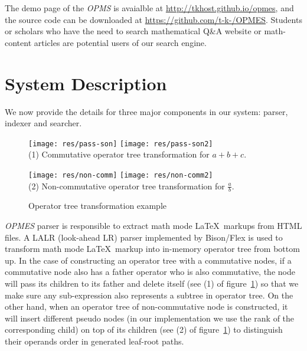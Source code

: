 \documentclass{llncs}
\begin{document}
The demo page of the {\em OPMS} is avaialble at
\url{http://tkhost.github.io/opmes}, and the source code can be downloaded 
at \url{https://github.com/t-k-/OPMES}. Students or scholars who have the 
need to search mathematical Q\&A website or math-content articles are potential 
users of our search engine.


\section{System Description}
We now provide the details for three major components in our system: 
parser, indexer and searcher.

\begin{figure}
\begin{minipage}[b]{2.2in}
\begin{center}
{\texttt{[image: res/pass-son]}}
\hspace*{0.2in}
{\texttt{[image: res/pass-son2]}}
\\ (1) Commutative operator tree transformation for $a+b+c$. 
\end{center}
\end{minipage}
\hspace*{0.2in}
\begin{minipage}[b]{2.2in}
\begin{center}
{\texttt{[image: res/non-comm]}}
\hspace*{0.2in}
{\texttt{[image: res/non-comm2]}}
\\ (2) Non-commutative operator tree transformation for $\frac a b$. 
\end{center}
\end{minipage}
\caption{Operator tree transformation example}\label{op_tr_trans}
\end{figure}

{\em OPMES} parser is responsible to extract math mode \LaTeX\ markups from HTML files. 
A LALR (look-ahead LR) parser implemented by Bison/Flex is used to transform math mode \LaTeX\ markup into in-memory operator tree from bottom up.
In the case of constructing an operator tree with a commutative nodes, if a commutative node also has a father operator who is also commutative, the node will pass its children to its father and delete itself (see (1) of figure~\ref{op_tr_trans}) so that we make sure any sub-expression also represents a subtree in operator tree.
On the other hand, when an operator tree of non-commutative node is constructed, it will insert different pseudo nodes (in our implementation we use the rank of the corresponding child) on top of its children (see (2) of figure~\ref{op_tr_trans}) to distinguish their operands order in generated leaf-root paths.
\end{document}
